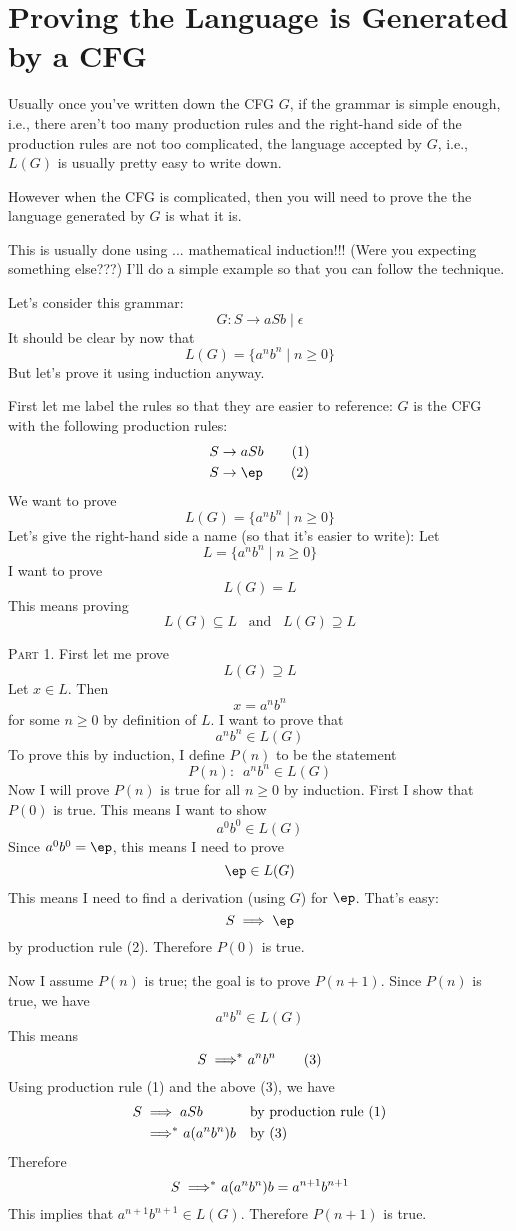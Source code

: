 \section{Proving the Language is Generated by a CFG}

Usually once you've written down the CFG $G$, if the grammar is simple enough,
i.e., there aren't too many production rules and the right-hand side of the 
production rules are not too complicated, the
language accepted by $G$, i.e., $L(G)$ is usually pretty easy to write down.

However when the CFG is complicated, then you will need to prove the
the language generated by $G$ is what it is.

This is usually done using ... mathematical induction!!! 
(Were you expecting something else???)
I'll do a simple example so that you can follow the technique.

Let's consider this grammar:
\[
G : S \rightarrow aSb \mid \epsilon
\]
It should be clear by now that 
\[
L(G) = \{ a^nb^n \mid n \geq 0 \}
\]
But let's prove it using induction anyway.

First let me label the rules so that they are easier to reference:
$G$ is the CFG with the following production rules:
\begin{align*}
S &\rightarrow aSb \tag{1} \\
S &\rightarrow \ep \tag{2} \\
\end{align*}
We want to prove
\[
L(G) = \{ a^nb^n \mid n \geq 0\}
\]
Let's give the right-hand side a name (so that it's easier to write):
Let
\[
L = \{ a^nb^n \mid n \geq 0\}
\]
I want to prove 
\[
L(G) = L
\]
This means proving 
\[
L(G) \subseteq L
\,\,\, \text{ and } \,\,\,
L(G) \supseteq L
\]

\textsc{Part 1.}
First let me prove
\[
L(G) \supseteq L
\]
Let $x \in L$.
Then 
\[
x = a^n b^n
\]
for some $n \geq 0$ by definition of $L$.
I want to prove that 
\[
a^n b^n \in L(G)
\]
To prove this by induction, I define $P(n)$ to be the statement
\[
P(n): \,\,\, a^n b^n \in L(G)
\]
Now I will prove $P(n)$ is true for all $n \geq 0$ by induction.
First I show that $P(0)$ is true. This means I want to show
\[
a^0 b^0 \in L(G)
\]
Since $a^0 b^0 = \ep$, this means I need to prove
\[
\ep \in L(G)
\]
This means I need to find a derivation (using $G$) for $\ep$.
That's easy:
\[
S \implies \ep
\]
by production rule (2).
Therefore $P(0)$ is true.

Now I assume $P(n)$ is true; the goal is to prove $P(n+1)$.
Since $P(n)$ is true, we have
\[
a^n b^n \in L(G)
\]
This means
\[
S \implies^{\hspace{-0.2cm}*}\ a^nb^n \tag{3}
\]
Using production rule (1) and the above (3), we have
\begin{align*}
S 
&\implies aSb                            & & \text{by production rule (1)} \\
&\implies^{\hspace{-0.2cm}*}\ a(a^nb^n)b & & \text{by (3)}
\end{align*}
Therefore
\[
S \implies^{\hspace{-0.2cm}*}\ a(a^nb^n)b = a^{n+1} b^{n+1}  
\]
This implies that $a^{n+1}b^{n+1} \in L(G)$.
Therefore $P(n+1)$ is true.

